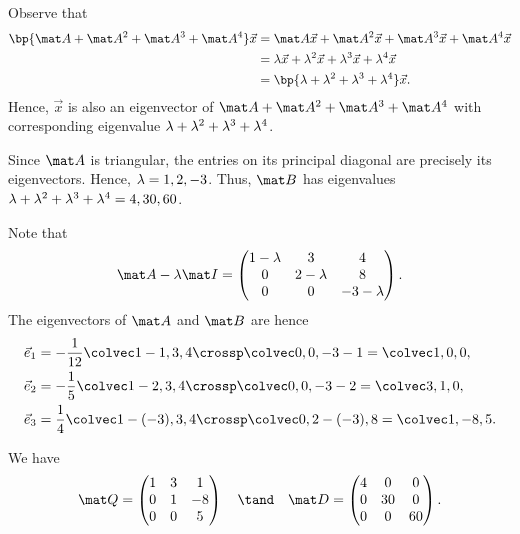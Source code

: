\begin{solution}
    \begin{ppart}
        Observe that
        \begin{align*}
            \bp{\mat A + \mat A^2 + \mat A^3 + \mat A^4} \vec x &= \mat A \vec x + \mat A^2 \vec x + \mat A^3 \vec x + \mat A^4 \vec x\\
            &= \l \vec x + \l^2 \vec x + \l^3 \vec x + \l^4 \vec x\\
            &= \bp{\l + \l^2 + \l^3 + \l^4} \vec x.
        \end{align*}
        Hence, $\vec x$ is also an eigenvector of $\mat A + \mat A^2 + \mat A^3 + \mat A^4$ with corresponding eigenvalue $\lambda + \lambda^2 + \lambda^3 + \lambda^4$.
    \end{ppart}
    \begin{ppart}
        Since $\mat A$ is triangular, the entries on its principal diagonal are precisely its eigenvectors. Hence, $\lambda = 1, 2, -3$. Thus, $\mat B$ has eigenvalues $\lambda + \lambda^2 + \lambda^3 + \lambda^4 = 4, 30, 60$.

        Note that \[\mat A - \l \mat I = \begin{pmatrix}1 - \l & 3 & 4 \\ 0 & 2-\l & 8 \\ 0 & 0 & -3-\l\end{pmatrix}.\] The eigenvectors of $\mat A$ and $\mat B$ are hence 
        \begin{align*}
            \vec e_1 &= -\frac1{12} \cveciii{1-1}34 \crossp \cveciii00{-3-1} = \cveciii100,\\
            \vec e_2 &= -\frac15 \cveciii{1-2}34 \crossp \cveciii00{-3-2} = \cveciii310,\\
            \vec e_3 &= \frac14 \cveciii{1-(-3)}34 \crossp \cveciii0{2-(-3)}8 = \cveciii1{-8}5.
        \end{align*}
    \end{ppart}
    \begin{ppart}
        We have \[\mat Q = \begin{pmatrix}1 & 3 & 1 \\ 0 & 1 & -8 \\ 0 & 0 & 5\end{pmatrix} \quad \tand \quad \mat D = \begin{pmatrix}4 & 0 & 0 \\ 0 & 30 & 0 \\ 0 & 0 & 60\end{pmatrix}.\]
    \end{ppart}
\end{solution}

